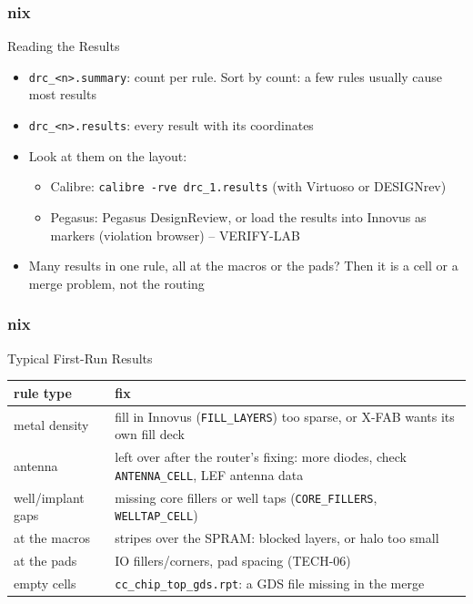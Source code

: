 \documentclass{beamer}
\newcommand{\astitle}{nix}
\newcommand{\assubtitle}{nix}
\newcommand{\cmd}[1]{\texttt{#1}}
\begin{document}
\renewcommand{\assubtitle}{Reading the Results}
\begin{frame}
\frametitle{\astitle}
\begin{block}{\assubtitle}
  \begin{itemize}
    \item \cmd{drc\_<n>.summary}: count per rule. Sort by count: a few rules
      usually cause most results
    \item \cmd{drc\_<n>.results}: every result with its coordinates
    \item Look at them on the layout:
    \begin{itemize}
      \item Calibre: \cmd{calibre -rve drc\_1.results} (with Virtuoso or
        DESIGNrev)
      \item Pegasus: Pegasus DesignReview, or load the results into
        Innovus as markers (violation browser) -- VERIFY-LAB
    \end{itemize}
    \item Many results in one rule, all at the macros or the pads? Then
      it is a cell or a merge problem, not the routing
  \end{itemize}
\end{block}
\end{frame}

\renewcommand{\assubtitle}{Typical First-Run Results}
\begin{frame}
\frametitle{\astitle}
\begin{block}{\assubtitle}
  \footnotesize
  \begin{tabularx}{\linewidth}{@{}lY@{}}
    \textbf{rule type} & \textbf{fix}\\\hline
    metal density    & fill in Innovus (\cmd{FILL\_LAYERS}) too sparse,
                       or X-FAB wants its own fill deck\\
    antenna          & left over after the router's fixing: more diodes,
                       check \cmd{ANTENNA\_CELL}, LEF antenna data\\
    well/implant gaps & missing core fillers or well taps
                       (\cmd{CORE\_FILLERS}, \cmd{WELLTAP\_CELL})\\
    at the macros    & stripes over the SPRAM: blocked layers, or halo
                       too small\\
    at the pads      & IO fillers/corners, pad spacing (TECH-06)\\
    empty cells      & \cmd{cc\_chip\_top\_gds.rpt}: a GDS file missing in
                       the merge\\
  \end{tabularx}
\end{block}
\end{frame}
\end{document}
